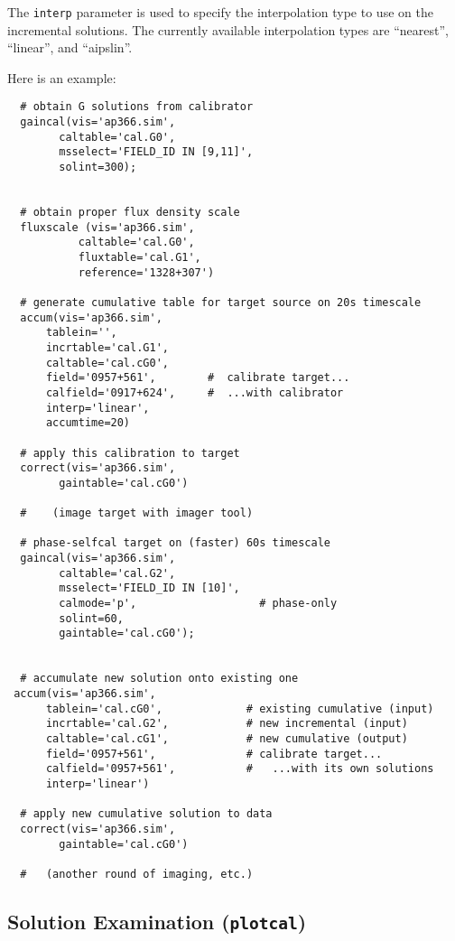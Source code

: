 The {\tt interp} parameter is used to specify the interpolation type
to use on the incremental solutions. The currently available
interpolation types are ``nearest'', ``linear'', and ``aipslin''.

Here is an example:

\small
\begin{verbatim}
  # obtain G solutions from calibrator
  gaincal(vis='ap366.sim',
        caltable='cal.G0',
        msselect='FIELD_ID IN [9,11]',
        solint=300);


  # obtain proper flux density scale
  fluxscale (vis='ap366.sim',
           caltable='cal.G0',
           fluxtable='cal.G1',
           reference='1328+307')

  # generate cumulative table for target source on 20s timescale
  accum(vis='ap366.sim',
      tablein='',
      incrtable='cal.G1',
      caltable='cal.cG0',
      field='0957+561',        #  calibrate target...
      calfield='0917+624',     #  ...with calibrator
      interp='linear',
      accumtime=20)

  # apply this calibration to target
  correct(vis='ap366.sim',
        gaintable='cal.cG0')

  #    (image target with imager tool)

  # phase-selfcal target on (faster) 60s timescale
  gaincal(vis='ap366.sim',
        caltable='cal.G2',
        msselect='FIELD_ID IN [10]',
        calmode='p',                   # phase-only
        solint=60,
        gaintable='cal.cG0');


  # accumulate new solution onto existing one
 accum(vis='ap366.sim',
      tablein='cal.cG0',             # existing cumulative (input)
      incrtable='cal.G2',            # new incremental (input)
      caltable='cal.cG1',            # new cumulative (output)
      field='0957+561',              # calibrate target...
      calfield='0957+561',           #   ...with its own solutions
      interp='linear')

  # apply new cumulative solution to data
  correct(vis='ap366.sim',
        gaintable='cal.cG0')

  #   (another round of imaging, etc.)
\end{verbatim}
\normalsize


\subsection{Solution Examination ({\tt plotcal})}
\label{subsection:synth.plotcal}


